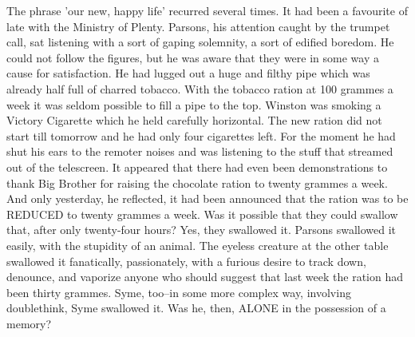 \documentclass{article}
\begin{document}
The phrase 'our new, happy life' recurred several times. It had been a
favourite of late with the Ministry of Plenty. Parsons, his attention
caught by the trumpet call, sat listening with a sort of gaping solemnity,
a sort of edified boredom. He could not follow the figures, but he was
aware that they were in some way a cause for satisfaction. He had lugged
out a huge and filthy pipe which was already half full of charred tobacco.
With the tobacco ration at 100 grammes a week it was seldom possible to
fill a pipe to the top. Winston was smoking a Victory Cigarette which he
held carefully horizontal. The new ration did not start till tomorrow and
he had only four cigarettes left. For the moment he had shut his ears to
the remoter noises and was listening to the stuff that streamed out of the
telescreen. It appeared that there had even been demonstrations to thank
Big Brother for raising the chocolate ration to twenty grammes a week. And
only yesterday, he reflected, it had been announced that the ration was
to be REDUCED to twenty grammes a week. Was it possible that they could
swallow that, after only twenty-four hours? Yes, they swallowed it. Parsons
swallowed it easily, with the stupidity of an animal. The eyeless creature
at the other table swallowed it fanatically, passionately, with a furious
desire to track down, denounce, and vaporize anyone who should suggest that
last week the ration had been thirty grammes. Syme, too--in some more
complex way, involving doublethink, Syme swallowed it. Was he, then, ALONE
in the possession of a memory?
\end{document}
